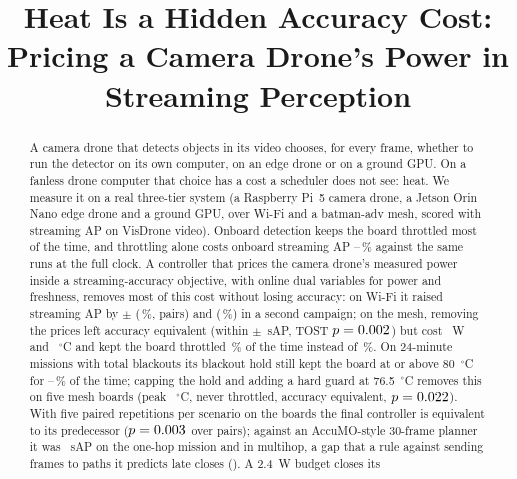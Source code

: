 \documentclass[conference]{IEEEtran}
\begin{document}
\title{Heat Is a Hidden Accuracy Cost:\\Pricing a Camera Drone's Power in Streaming Perception}
\author{
}
\maketitle

\begin{abstract}
A camera drone that detects objects in its video chooses, for every frame, whether to run the detector on its own
computer, on an edge drone or on a ground GPU. On a fanless drone computer that choice has a cost a scheduler does not
see: heat. We measure it on a real three-tier system (a Raspberry Pi~5 camera drone, a Jetson Orin Nano edge drone and
a ground GPU, over Wi-Fi and a batman-adv mesh, scored with streaming AP on VisDrone video). Onboard detection keeps the
board throttled most of the time, and throttling alone costs onboard streaming AP \ThrottleLossMin--\ThrottleLossMax\,\%
against the same runs at the full clock. A controller that prices the camera drone's measured power inside a
streaming-accuracy objective, with online dual variables for power and freshness, removes most of this cost without
losing accuracy: on Wi-Fi it raised streaming AP by \EnGain{}$\pm$\EnGainCi{} (\EnGainPct\,\%, \EnPairs{} pairs) and \EnRepGain{}
(\EnRepGainPct\,\%) in a second campaign; on the mesh, removing the prices left accuracy equivalent (within $\pm$\EqMargin~sAP, TOST $p=0.002$) but cost \MeshNoPriceW{}~W and
\MeshNoPriceC{}~$^\circ$C and kept the board throttled \MeshNoPriceThrottle{}\,\% of the time instead of
\MeshVThrottle{}\,\%. On 24-minute missions with total blackouts its blackout hold still kept the board at or above
80~$^\circ$C for \BdHoldHotMin--\BdHoldHotMax\,\% of the time; capping the hold and adding a hard guard at 76.5~$^\circ$C
removes this on five mesh boards (peak \BdFinPeak~$^\circ$C, never throttled, accuracy equivalent, $p=0.022$). With five paired
repetitions per scenario on the boards the final controller is equivalent to its predecessor ($p=0.003$ over \EqFinPairs{} pairs); against an AccuMO-style 30-frame planner it was
\BdFinVsAccMis~sAP on the one-hop mission and \BdFinVsAccMulti{} in multihop, a gap that a rule against sending frames
to paths it predicts late closes (\BdFixMulti). A 2.4~W budget closes its

\end{abstract}
\end{document}
